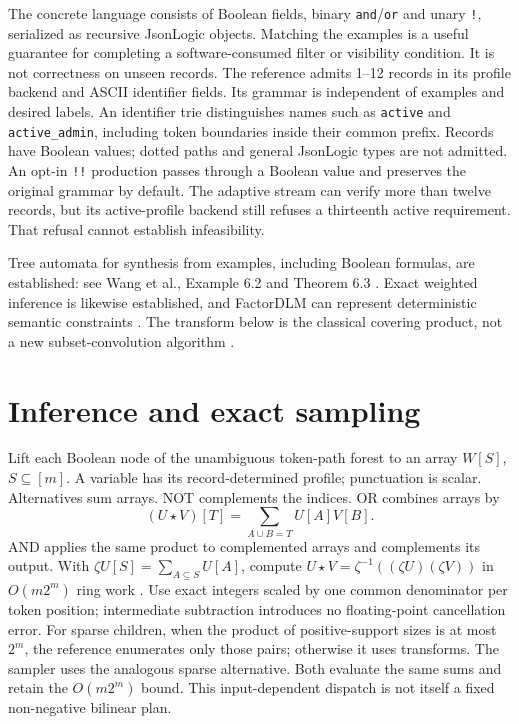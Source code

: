 \documentclass[11pt,a4paper]{article}
\begin{document}
The concrete language consists of Boolean fields, binary \texttt{and}/\texttt{or}
and unary \texttt{!}, serialized as recursive JsonLogic objects. Matching the
examples is a useful guarantee for completing a software-consumed filter or
visibility condition. It is not correctness on unseen records. The reference
admits 1--12 records in its profile backend and ASCII identifier fields.
Its grammar is independent of examples and desired labels.
An identifier trie distinguishes names such as \texttt{active} and
\texttt{active\_admin}, including token boundaries inside their common prefix.
Records have Boolean values; dotted paths and general JsonLogic types are not
admitted.
An opt-in \texttt{!!} production passes through a Boolean value and preserves
the original grammar by default. The adaptive stream can verify more than
twelve records, but its active-profile backend still refuses a thirteenth
active requirement. That refusal cannot establish infeasibility.

Tree automata for synthesis from examples, including Boolean formulas,
are established: see Wang et al., Example 6.2 and Theorem 6.3
\cite{wang2017completion}. Exact weighted inference is likewise established,
and FactorDLM can represent deterministic semantic constraints
\cite{su2026factor}. The transform below is the classical covering product,
not a new subset-convolution algorithm \cite{bjorklund2006fourier}.

\section{Inference and exact sampling}
Lift each Boolean node of the unambiguous token-path forest to an array
$W[S]$, $S\subseteq[m]$. A variable has its record-determined profile;
punctuation is scalar. Alternatives sum arrays. NOT complements the indices.
OR combines arrays by
\[
 (U\star V)[T]=\sum_{A\cup B=T}U[A]V[B].
\]
AND applies the same product to complemented arrays and complements its
output. With $\zeta U[S]=\sum_{A\subseteq S}U[A]$, compute
$U\star V=\zeta^{-1}((\zeta U)(\zeta V))$ in $O(m2^m)$ ring work
\cite[Section 2.5, equations (15)--(17)]{bjorklund2006fourier}.
Use exact integers scaled by one common denominator per token position;
intermediate subtraction introduces no floating-point cancellation error.
For sparse children, when the product of positive-support sizes is at most
$2^m$, the reference enumerates only those pairs; otherwise it uses transforms.
The sampler uses the analogous sparse alternative. Both evaluate the same sums
and retain the $O(m2^m)$ bound. This input-dependent dispatch is not itself a
fixed non-negative bilinear plan.
\end{document}
